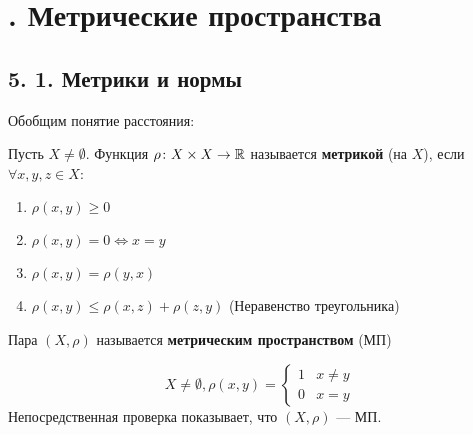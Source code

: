 \section{. Метрические пространства}
\subsection{5. 1. Метрики и нормы}
Обобщим понятие расстояния:
\begin{definition}
    Пусть $X \neq \emptyset$. Функция $\rho \colon X \times X \rightarrow \mathbb{R}$ называется \textbf{метрикой} (на $X$), если $\forall x, y, z \in X$:
    \begin{enumerate}
        \item $\rho(x, y) \geq 0$
        \item $\rho(x, y) = 0 \iff x = y$
        \item $\rho(x, y) = \rho(y, x)$
        \item $\rho(x, y) \leq \rho(x, z) + \rho(z, y)$ (Неравенство треугольника)
    \end{enumerate}
    Пара $(X, \rho)$ называется \textbf{метрическим пространством} (МП)
\end{definition}
\begin{example}
    \[
        X \neq \emptyset, \rho(x, y) = \begin{cases}
            1 & x \neq y \\
            0 & x = y
        \end{cases}
    \]
    Непосредственная проверка показывает, что $(X, \rho)$ --- МП.
\end{example}


